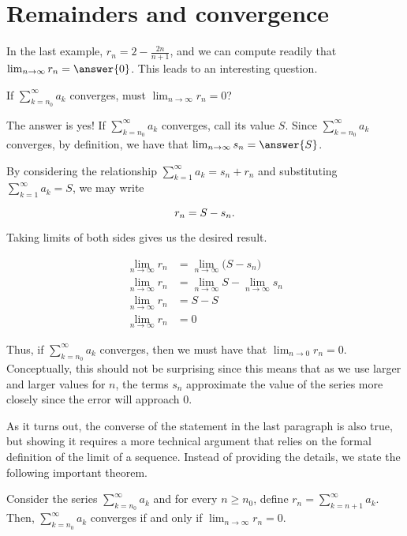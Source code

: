 \documentclass{ximera}
\begin{document}
\section{Remainders and convergence}

In the last example, $r_n = 2-\frac{2n}{n+1}$, and we can compute readily that $\lim_{n \to \infty} r_n = \answer{0}$.  This leads to an interesting question.

\begin{question}
If $\sum_{k=n_0}^\infty a_k$ converges, must $\lim_{n \to \infty} r_n =0$?
\end{question}

The answer is yes!  If $\sum_{k=n_0}^\infty a_k$ converges, call its value $S$.  Since $\sum_{k=n_0}^\infty a_k$ converges, by definition, we have that $\lim_{n \to \infty} s_n = \answer{S}$.  

By considering the relationship $ \sum_{k=1}^{\infty} a_k = s_n+r_n$ and substituting $ \sum_{k=1}^{\infty} a_k =S$, we may write 

\[ r_n = S - s_n. \\
\]

Taking limits of both sides gives us the desired result.

\begin{align*}
\lim_{n \to \infty} r_n &= \lim_{n \to \infty} \bigg(S- s_n\bigg) \\
\lim_{n \to \infty} r_n &= \lim_{n \to \infty} S- \lim_{n \to \infty} s_n \\
\lim_{n \to \infty} r_n &= S- S  \\
 \lim_{n \to \infty} r_n  &= 0
\end{align*}

Thus, if $\sum_{k=n_0}^{\infty} a_k$ converges, then we must have that $\lim_{n \to 0} r_n =0$.  Conceptually, this should not be surprising since this means that as we use larger and larger values for $n$, the terms $s_n$ approximate the value of the series more closely since the error will approach $0$. 

As it turns out, the converse of the statement in the last paragraph is also true, but showing it requires a more technical argument that relies on the formal definition of the limit of a sequence.  Instead of providing the details, we state the following important theorem.  

\begin{theorem}
Consider the series $\sum_{k=n_0}^{\infty} a_k$ and for every $n \geq n_0$, define $r_n = \sum_{k=n+1}^{\infty} a_k$.  Then, $\sum_{k=n_0}^{\infty} a_k$ converges if and only if $\lim_{n \to \infty} r_n =0$.
\end{theorem}
\end{document}
